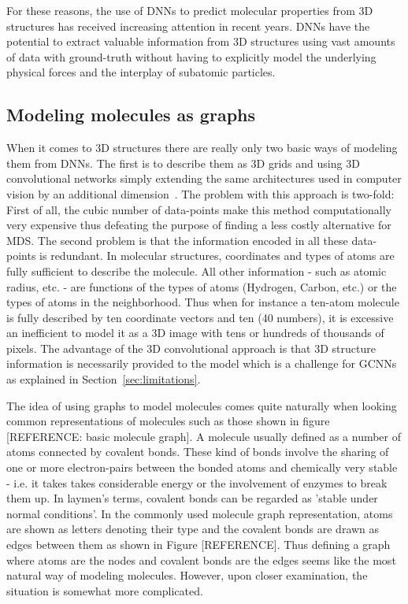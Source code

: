 For these reasons, the use of DNNs to predict molecular properties from 3D structures has received increasing attention in recent years. DNNs have the potential to extract valuable information from 3D structures using vast amounts of data with ground-truth without having to explicitly model the underlying physical forces and the interplay of subatomic particles.

\subsection{Modeling molecules as graphs}

When it comes to 3D structures there are really only two basic ways of modeling them from DNNs. The first is to describe them as 3D grids and using 3D convolutional networks simply extending the same architectures used in computer vision by an additional dimension~\cite{Wallach2015}. The problem with this approach is two-fold: First of all, the cubic number of data-points make this method computationally very expensive thus defeating the purpose of finding a less costly alternative for MDS. The second problem is that the information encoded in all these data-points is redundant. In molecular structures, coordinates and types of atoms are fully sufficient to describe the molecule. All other information - such as atomic radius, etc. - are functions of the types of atoms (Hydrogen, Carbon, etc.) or the types of atoms in the neighborhood. Thus when for instance a ten-atom molecule is fully described by ten coordinate vectors and ten (40 numbers), it is excessive an inefficient to model it as a 3D image with tens or hundreds of thousands of pixels. The advantage of the 3D convolutional approach is that 3D structure information is necessarily provided to the model which is a challenge for GCNNs as explained in Section~\ref{sec:limitations}.

The idea of using graphs to model molecules comes quite naturally when looking common representations of molecules such as those shown in figure [REFERENCE: basic molecule graph]. A molecule usually defined as a number of atoms connected by covalent bonds. These kind of bonds involve the sharing of one or more electron-pairs between the bonded atoms and chemically very stable - i.e. it takes takes considerable energy or the involvement of enzymes to break them up. In laymen's terms, covalent bonds can be regarded as 'stable under normal conditions'. In the commonly used molecule graph representation, atoms are shown as letters denoting their type and the covalent bonds are drawn as edges between them as shown in Figure [REFERENCE]. Thus defining a graph where atoms are the nodes and covalent bonds are the edges seems like the most natural way of modeling molecules. However, upon closer examination, the situation is somewhat more complicated.


